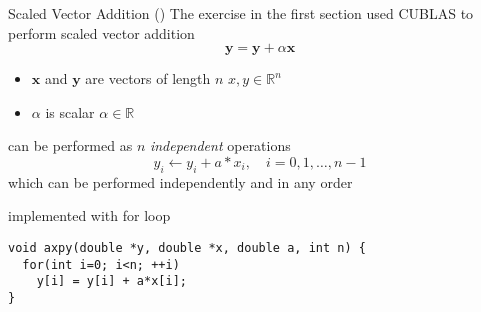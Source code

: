 \begin{frame}[fragile]{}
    \begin{info}{Scaled Vector Addition (\axpy)}
        The exercise in the first section used CUBLAS to perform scaled vector addition
            $$\mathbf{y} = \mathbf{y} + \alpha \mathbf{x}$$
            \vspace{-15pt}
        \begin{itemize}
            \item $\mathbf{x}$ and $\mathbf{y}$ are vectors of length $n$ \hfill $x,y \in \mathbb{R}^n$
            \item $\alpha$ is scalar \hfill $\alpha\in\mathbb{R}$
        \end{itemize}
        \axpy can be performed as $n$ \emph{independent} operations
        $$y_i \leftarrow y_i + a*x_i,\quad i = {0, 1, \dots, n-1}$$
        which can be performed independently and in any order
    \end{info}

    \begin{code}{\axpy implemented with for loop}
        \begin{lstlisting}[style=boxcuda]
void axpy(double *y, double *x, double a, int n) {
  for(int i=0; i<n; ++i)
    y[i] = y[i] + a*x[i];
}
        \end{lstlisting}
    \end{code}

\end{frame}

